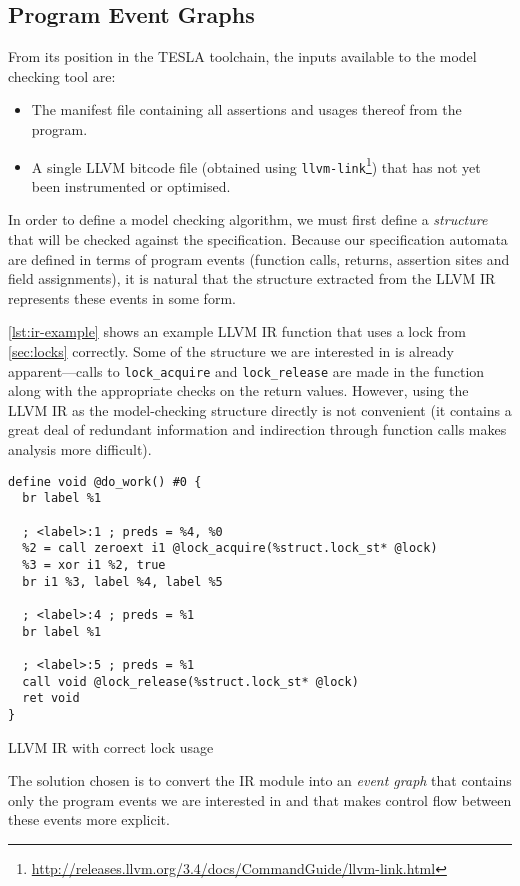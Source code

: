 \subsection{Program Event Graphs}

From its position in the TESLA toolchain, the inputs available to the model
checking tool are:
\begin{itemize}
  \item The manifest file containing all assertions and usages thereof from the
    program.
  \item A single LLVM bitcode file (obtained using
    \texttt{llvm-link}\footnote{\url{http://releases.llvm.org/3.4/docs/CommandGuide/llvm-link.html}})
    that has not yet been instrumented or optimised.
\end{itemize}
In order to define a model checking algorithm, we must first define a
\emph{structure} that will be checked against the specification. Because our
specification automata are defined in terms of program events (function calls,
returns, assertion sites and field assignments), it is natural that the
structure extracted from the LLVM IR represents these events in some form.

\autoref{lst:ir-example} shows an example LLVM IR function that uses a lock from
\autoref{sec:locks} correctly. Some of the structure we are interested in is
already apparent---calls to \texttt{lock_acquire} and
\texttt{lock_release} are made in the function along with the appropriate
checks on the return values. However, using the LLVM IR as the model-checking
structure directly is not convenient (it contains a great deal of redundant
information and indirection through function calls makes analysis more
difficult).

\begin{listing}
  \begin{verbatim}
define void @do_work() #0 {
  br label %1

  ; <label>:1 ; preds = %4, %0
  %2 = call zeroext i1 @lock_acquire(%struct.lock_st* @lock)
  %3 = xor i1 %2, true
  br i1 %3, label %4, label %5

  ; <label>:4 ; preds = %1
  br label %1

  ; <label>:5 ; preds = %1
  call void @lock_release(%struct.lock_st* @lock)
  ret void
}
  \end{verbatim}
  \caption{LLVM IR with correct lock usage}
  \label{lst:ir-example}
\end{listing}

The solution chosen is to convert the IR module into an \emph{event graph} that
contains only the program events we are interested in and that makes control
flow between these events more explicit.

